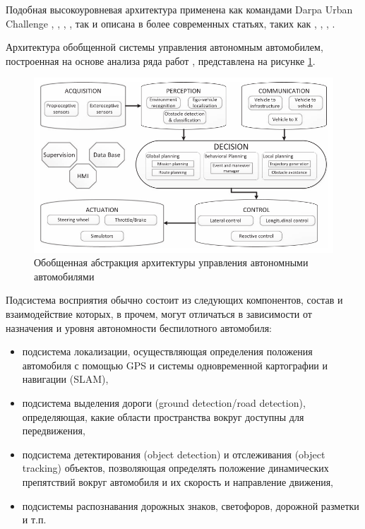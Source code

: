 Подобная высокоуровневая архитектура применена как командами Darpa Urban Challenge \cite{darpa_junior}, \cite{darpa_mit},
\cite{darpa_boss}, \cite{darpa_annieway}, так и описана в более современных статьях,
таких как \cite{developing_car_1}, \cite{developing_car_2}, \cite{car_proud}, \cite{car_race}.

Архитектура обобщенной системы управления автономным автомобилем, построенная на основе анализа ряда
работ \cite{motion_planning_review}, представлена на рисунке \ref{img:general_arch}.

\begin{figure}[h]
    \centering
    \includegraphics[width=\linewidth]{images/general_arch}
    \caption{Обобщенная абстракция архитектуры управления автономными автомобилями \cite{motion_planning_review}}
    \label{img:general_arch}
\end{figure}

Подсистема восприятия обычно состоит из следующих компонентов, состав и взаимодействие которых, в прочем, могут
отличаться в зависимости от назначения и уровня автономности беспилотного автомобиля:
\begin{itemize}
    \item подсистема локализации, осуществляющая определения положения автомобиля с помощью GPS и системы одновременной
          картографии и навигации (SLAM),
    \item подсистема выделения дороги (ground detection/road detection), определяющая, какие области пространства вокруг
          доступны для передвижения,
    \item подсистема детектирования (object detection)  и отслеживания (object tracking) объектов, позволяющая определять
          положение динамических препятствий вокруг автомобиля и их скорость и направление движения,
    \item подсистемы распознавания дорожных знаков, светофоров, дорожной разметки и т.п.
\end{itemize}

